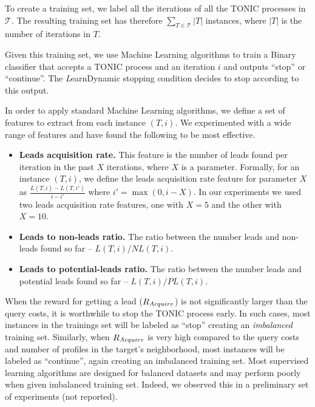 \documentclass[journal]{IEEEtran}
\newcommand{\learnDynamic}{{\textit LearnDynamic}}
\newcommand{\Acquire}{{\textit Acquire}}
\begin{document}
To create a training set, we label all the iterations of all the TONIC processes in $\mathcal{T}$. 
The resulting training set has therefore $\sum_{T\in\mathcal{T}} |T|$ instances, where $|T|$ is the number of iterations in $T$. 

Given this training set, we use Machine Learning algorithms to train a Binary classifier that accepts a TONIC process and an iteration $i$ and outputs ``stop'' or ``continue''. 
The \learnDynamic{} stopping condition decides to stop according to this output. 

In order to apply standard Machine Learning algorithms, we define a set of features to extract from each instance  \((T,i)\). 
We experimented with a wide range of features and have found the following to be most effective. 
\begin{itemize}
\item {\bf Leads acquisition rate.} This feature is the  number of leads found per iteration in the past $X$ iterations, where $X$ is a parameter. Formally, for an instance $(T,i)$, we define the leads acquisition rate feature for parameter $X$ as $\frac{L(T,i)-L(T,i')}{i-i'}$ where $i'=\max(0,i-X)$. In our experiments we used two leads acquisition rate features, one with $X=5$ and the other with $X=10$.
\item {\bf Leads to non-leads ratio.} The ratio between the number leads and non-leads found so far -- $L(T,i)/NL(T,i)$.
\item {\bf Leads to potential-leads ratio.} The ratio between the number leads and potential leads found so far -- $L(T,i)/PL(T,i)$.
\end{itemize}


When the reward for getting a lead ($R_{\Acquire{}}$) is not significantly larger than the query costs, it is worthwhile to stop the TONIC process early. In such cases, most instances in the trainings set will be labeled as ``stop'' creating an \emph{imbalanced} training set. Similarly, when $R_{\Acquire{}}$ is very high compared to the query costs and number of profiles in the target's neighborhood, most instances will be labeled as ``continue'', again creating an imbalanced training set. Most supervised learning algorithms are designed for balanced datasets and may perform poorly when given imbalanced training set. Indeed, we observed this in a preliminary set of experiments (not reported). 
\end{document}

